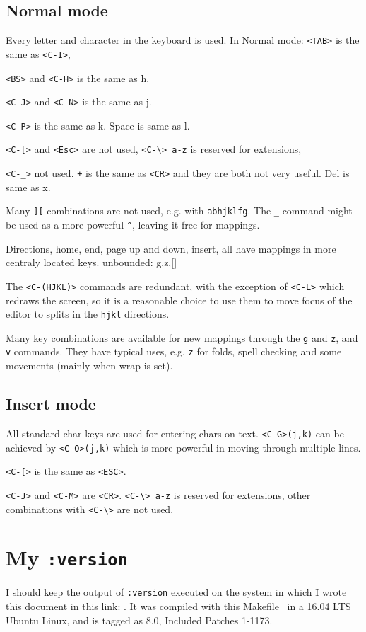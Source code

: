 \documentclass{article}
\newcommand{\ttt}[1] {
	\texttt{<#1>}}
\newcommand{\tttt}[1]{\texttt{#1}}
\begin{document}
\subsection{Normal mode}
Every letter and character in the keyboard is used.
In Normal mode: \ttt{TAB} is the same as \ttt{C-I},
\ttt{BS} and \ttt{C-H} is the same as h.
\ttt{C-J} and \ttt{C-N} is the same as j.
\ttt{C-P} is the same as k.
Space is same as l.
\ttt{C-[} and \ttt{Esc} are not used,
\tttt{<C-\textbackslash> a-z} is reserved for extensions,
\ttt{C-\_} not used.
\tttt{+} is the same as \ttt{CR} and they are both not very useful.
Del is same as x.

Many \tttt{][} combinations are not used, e.g.
with \tttt{abhjklfg}.
The \tttt{\_} command might be used as a more powerful \tttt{\^},
leaving it free for mappings.

Directions, home, end, page up and down, insert, all have mappings
in more centraly located keys.
unbounded: g,z,[]

The \ttt{C-(HJKL)} commands are redundant,
with the exception of \ttt{C-L} which redraws the screen,
so it is a reasonable choice to use them to move focus
of the editor to splits in the \tttt{hjkl} directions.

Many key combinations are available for new mappings through the \tttt{g}
and \tttt{z}, and \tttt{v} commands.
They have typical uses, e.g. \tttt{z} for folds,
spell checking and some movements (mainly when wrap is set).

\subsection{Insert mode}
All standard char keys are used for entering chars on text.
\tttt{<C-G>(j,k)} can be achieved by \tttt{<C-O>(j,k)} which is more powerful
in moving through multiple lines.
\ttt{C-[} is the same as \ttt{ESC}.
\ttt{C-J} and \ttt{C-M} are \ttt{CR}.
\tttt{<C-\textbackslash> a-z} is reserved for extensions,
other combinations with \ttt{C-\textbackslash} are not used.

\section{My \tttt{:version}}
I should keep the output of \tttt{:version} executed on the system
in which I wrote this document in this link:
\url{}.
It was compiled with this Makefile~\cite{makefile}
in a 16.04 LTS Ubuntu Linux,
and is tagged as 8.0, Included Patches 1-1173.
\end{document}
